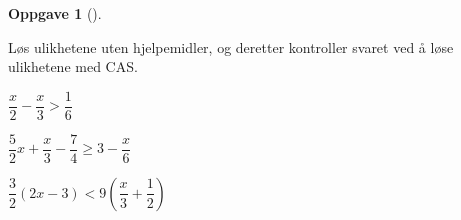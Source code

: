 \documentclass[
  letterpaper,
  DIV=11,
  numbers=noendperiod]{scrartcl}
\theoremstyle{definition}
\theoremstyle{definition}
\newtheorem{exercise}{Oppgave}[section]
\theoremstyle{remark}
\begin{document}
\begin{exercise}[]\protect\hypertarget{exr-linulikhetOppgave4}{}\label{exr-linulikhetOppgave4}

Løs ulikhetene uten hjelpemidler, og deretter kontroller svaret ved å
løse ulikhetene med CAS.

\(\dfrac{x}{2}-\dfrac{x}{3} > \dfrac{1}{6}\)

\(\dfrac{5}{2}x+\dfrac{x}{3}-\dfrac{7}{4} \geq 3-\dfrac{x}{6}\)

\(\dfrac{3}{2}(2x - 3) < 9\left(\dfrac{x}{3} + \dfrac{1}{2}\right)\)

\end{exercise}
\end{document}
